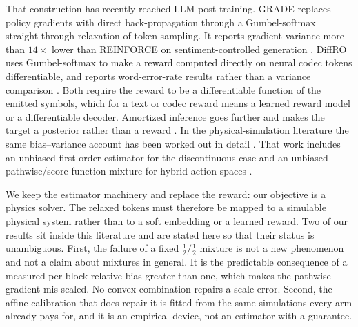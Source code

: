 That construction has recently reached LLM post-training.  GRADE replaces policy
gradients with direct back-propagation through a Gumbel-softmax
straight-through relaxation of token sampling.  It reports gradient variance more
than $14\times$ lower than REINFORCE on sentiment-controlled generation
\cite{grade2026}.  DiffRO uses Gumbel-softmax to make a reward computed directly
on neural codec tokens differentiable, and reports word-error-rate results
rather than a variance comparison \cite{diffro2025}.  Both require the reward to
be a differentiable function of the emitted symbols, which for a text or codec
reward means a learned reward model or a differentiable decoder.  Amortized
inference goes further and makes the target a posterior rather than a reward
\cite{hu2023abs}.  In the physical-simulation literature the same bias--variance
account has been worked out in detail \cite{suh2022diffsim,onoda2026ddcg}.  That
work includes an unbiased first-order estimator for the discontinuous case
\cite{scheffler2026cfobg} and an unbiased pathwise/score-function mixture for
hybrid action spaces \cite{hpo2026}.

We keep the estimator machinery and replace the reward: our objective is a
physics solver.  The relaxed tokens must therefore be mapped to a simulable
physical system rather than to a soft embedding or a learned reward.  Two of our
results sit inside this literature and are stated here so that their status is
unambiguous.  First, the failure of a fixed $\tfrac12/\tfrac12$ mixture is not a
new phenomenon and not a claim about mixtures in general.  It is the predictable
consequence of a measured per-block relative bias greater than one, which makes
the pathwise gradient mis-scaled.  No convex combination repairs a scale
error.  Second, the affine calibration that does repair it is fitted from the
same simulations every arm already pays for, and it is an empirical device, not
an estimator with a guarantee.

